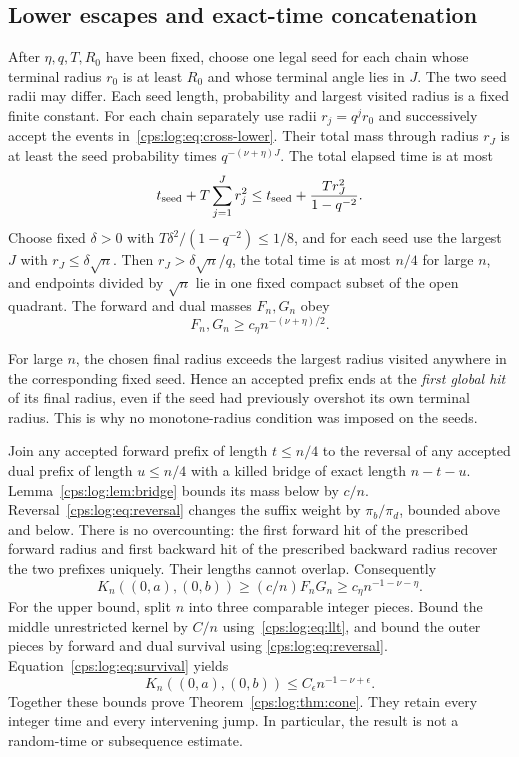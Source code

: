 \documentclass[11pt,letterpaper]{article}
\numberwithin{equation}{section}
\theoremstyle{remark}\newtheorem{remark}[theorem]{Remark}
\begin{document}
\subsection{Lower escapes and exact-time concatenation}\label{cps:log:sec:lower}
After $\eta,q,T,R_0$ have been fixed, choose one legal seed for each
chain whose terminal radius $r_0$ is at least $R_0$ and whose terminal
angle lies in $J$. The two seed radii may differ. Each seed length,
probability and largest visited radius is a fixed finite constant.
For each chain separately use radii $r_j=q^jr_0$ and successively
accept the events in~\eqref{cps:log:eq:cross-lower}. Their total mass through
radius $r_J$ is at least the seed probability times $q^{-(\nu+\eta)J}$.
The total elapsed time is at most
\begin{equation}\label{cps:log:eq:lower-time}
 t_{\rm seed}+T\sum_{j=1}^Jr_j^2
 \le t_{\rm seed}+\frac{Tr_J^2}{1-q^{-2}}.
\end{equation}
Choose fixed $\delta>0$ with
$T\delta^2/(1-q^{-2})\le1/8$, and for each seed use the largest $J$
with $r_J\le\delta\sqrt n$. Then $r_J>\delta\sqrt n/q$, the total
time is at most $n/4$ for large $n$, and endpoints divided by $\sqrt n$
lie in one fixed compact subset of the open quadrant. The forward and
dual masses $F_n,G_n$ obey
\begin{equation}\label{cps:log:eq:escapemass}
 F_n,G_n\ge c_\eta n^{-(\nu+\eta)/2}.
\end{equation}

For large $n$, the chosen final radius exceeds the largest radius
visited anywhere in the corresponding fixed seed. Hence an accepted
prefix ends at the \emph{first global hit} of its final radius, even
if the seed had previously overshot its own terminal radius. This is
why no monotone-radius condition was imposed on the seeds.

Join any accepted forward prefix of length $t\le n/4$ to the reversal
of any accepted dual prefix of length $u\le n/4$ with a killed bridge
of exact length $n-t-u$. Lemma~\ref{cps:log:lem:bridge} bounds its mass below
by $c/n$. Reversal~\eqref{cps:log:eq:reversal} changes the suffix weight by
$\pi_b/\pi_d$, bounded above and below. There is no overcounting:
the first forward hit of the prescribed forward radius and first
backward hit of the prescribed backward radius recover the two
prefixes uniquely. Their lengths cannot overlap. Consequently
\begin{equation}\label{cps:log:eq:lower-final}
 K_n((0,a),(0,b))\ge(c/n)F_nG_n
       \ge c_\eta n^{-1-\nu-\eta}.
\end{equation}
For the upper bound, split $n$ into three comparable integer pieces.
Bound the middle unrestricted kernel by $C/n$ using~\eqref{cps:log:eq:llt},
and bound the outer pieces by forward and dual survival using
\eqref{cps:log:eq:reversal}. Equation~\eqref{cps:log:eq:survival} yields
\begin{equation}\label{cps:log:eq:upper-final}
 K_n((0,a),(0,b))\le C_\epsilon n^{-1-\nu+\epsilon}.
\end{equation}
Together these bounds prove Theorem~\ref{cps:log:thm:cone}. They retain every
integer time and every intervening jump. In particular, the result
is not a random-time or subsequence estimate.
\end{document}
